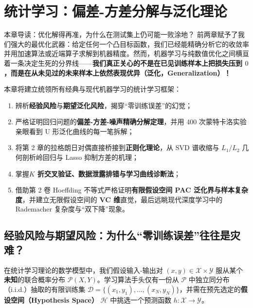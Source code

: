 \chapter[统计学习：偏差-方差与泛化界]{统计学习：偏差-方差分解与泛化理论}\label{ch:v4-stat-learning}


\begin{chapIntro}{本章导读：优化解得再准，为什么在测试集上仍可能一败涂地？}
前两章赋予了我们强大的最优化武器：给定任何一个凸目标函数，我们已经能精确分析它的收敛率并用加速算法或近端算子求解到机器精度。然而，机器学习与纯数值优化之间横亘着一条决定生死的分界线——\textbf{我们真正关心的不是在已见训练样本上把损失压到 $0$，而是在从未见过的未来样本上依然表现优异（泛化，Generalization）！}

本章将建立统领所有经典与现代机器学习的统计学习框架：
\begin{enumerate}
  \item 辨析\textbf{经验风险}与\textbf{期望泛化风险}，揭穿“零训练误差”的幻觉；
  \item 严格证明回归问题的\textbf{偏差-方差-噪声精确分解定理}，并用 400 次蒙特卡洛实验亲眼看到 U 形泛化曲线的每一笔拆解；
  \item 将第 2 章的拉格朗日对偶直接桥接到\textbf{正则化理论}，从 SVD 谱收缩与 $L_1/L_2$ 几何剖析岭回归与 Lasso 抑制方差的机理；
  \item 掌握\textbf{$K$ 折交叉验证、数据泄露排错与学习曲线诊断法}；
  \item 借助第 2 卷 Hoeffding 不等式严格证明\textbf{有限假设空间 PAC 泛化界与样本复杂度}，并建立无限假设空间的 \textbf{VC 维}直觉，最后远眺现代深度学习中的 Rademacher 复杂度与“双下降”现象。
\end{enumerate}
\end{chapIntro}

\section{经验风险与期望风险：为什么“零训练误差”往往是灾难？}

在统计学习理论的数学模型中，我们假设输入-输出对 $(x, y) \in \mathcal{X} \times \mathcal{Y}$ 服从某个\textbf{未知}的联合概率分布 $\mathcal{P}(X, Y)$。学习算法手头仅有一份从 $\mathcal{P}$ 中独立同分布（i.i.d.）抽取的有限训练集 $\mathcal{D} = \{(x_1, y_1), \dots, (x_N, y_N)\}$，并需在预先选定的\textbf{假设空间（Hypothesis Space）} $\mathcal{H}$ 中挑选一个预测函数 $h: \mathcal{X} \to \mathcal{Y}$。

